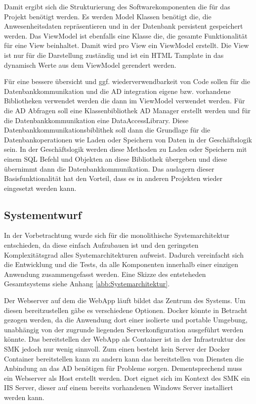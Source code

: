 Damit ergibt sich die Strukturierung des Softwarekomponenten die für das Projekt benötigt werden. Es werden Model Klassen benötigt die, die Anwesenheitsdaten repräsentieren und in der Datenbank persistent gespeichert werden. Das ViewModel ist ebenfalls eine Klasse die, die gesamte Funktionalität für eine View beinhaltet. Damit wird pro View ein ViewModel erstellt. Die View ist nur für die Darstellung zuständig und ist ein HTML Tamplate in das dynamisch Werte aus dem ViewModel gerendert werden.

Für eine bessere übersicht und ggf. wiederverwendbarkeit von Code sollen für die Datenbankkommunikation und die AD integration eigene bzw. vorhandene Bibliotheken verwendet werden die dann im ViewModel verwendet werden. Für die AD Abfragen soll eine Klassenbibliothek AD Manager erstellt werden und für die Datenbankkommunikation eine DataAccessLibrary. Diese Datenbankkommunikationsbiblithek soll dann die Grundlage für die Datenbankoperationen wie Laden oder Speichern von Daten in der Geschäftslogik sein. In der Geschäftslogik werden diese Methoden zu Laden oder Speichern mit einem SQL Befehl und Objekten an diese Bibliothek übergeben und diese übernimmt dann die Datenbankkommunikation. Das auslagern dieser Basisfunktionalität hat den Vorteil, dass es in anderen Projekten wieder eingesetzt werden kann.

\subsection{Systementwurf}
\label{sec:Systementwurf}
In der Vorbetrachtung wurde sich für die monolithische Systemarchitektur entschieden, da diese einfach Aufzubauen ist und den geringsten Komplexitätsgrad alles Systemarchitekturen aufweist. Dadurch vereinfacht sich die Entwicklung und die Tests, da alle Komponenten innerhalb einer einzigen Anwendung zusammengefasst werden. Eine Skizze des entsteheden Gesamtsystems siehe Anhang \ref{abb:Systemarchitektur}.

Der Webserver auf dem die WebApp läuft bildet das Zentrum des Systems. Um diesen bereitzustellen gäbe es verschiedene Optionen. Docker könnte in Betracht gezogen werden, da die Anwendung dort einer isolierte und portable Umgebung, unabhängig von der zugrunde liegenden Serverkonfiguration ausgeführt werden könnte. Das bereitstellen der WebApp als Container ist in der Infrastruktur des SMK jedoch nur wenig sinnvoll. Zum einen besteht kein Server der Docker Container bereitstellen kann zu andern kann das bereitstellen von Diensten die Anbindung an das AD benötigen für Probleme sorgen. Dementsprechend muss ein Webserver als Host erstellt werden. Dort eignet sich im Kontext des SMK ein IIS Server, dieser auf einem bereits vorhandenen Windows Server installiert werden kann.

